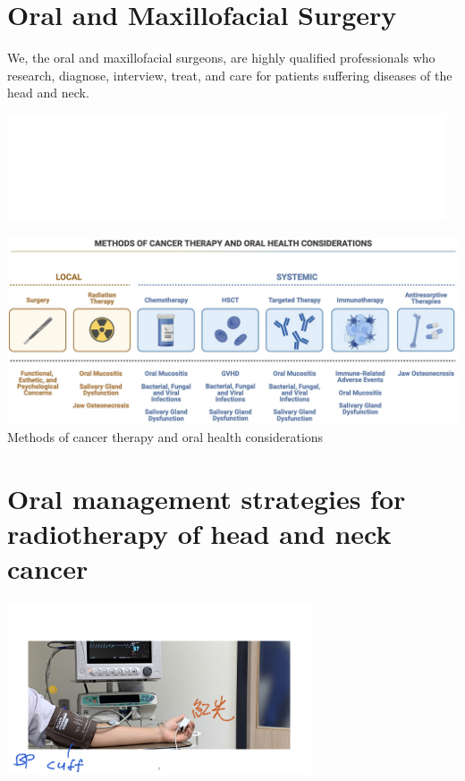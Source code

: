 \documentclass[
paper=landscape,
paper=160mm:90mm, %
fontsize=11pt, %
pagesize, %
parskip=half-, %
]{scrartcl} %
\theoremstyle{mythmstyle} %
\begin{document}
\section{Oral and Maxillofacial Surgery}

We, the oral and maxillofacial surgeons, are highly qualified professionals who research, diagnose, interview, treat, and care for patients suffering diseases of the head and neck.


\includegraphics[width=13cm]{TAOMS_LOGO.png}

\clearpage
\autocite{Harris2022}
\includegraphics[width=0.8\linewidth]{froh-03-874332-g001.jpg}
Methods of cancer therapy and oral health considerations


\section{Oral management strategies for radiotherapy of head and neck cancer} %
\autocite{Kawashita2020}
\begin{center} %
    \centering
    \captionsetup{labelformat=empty}
    \includegraphics[width=9cm]{ContemporaryOMS_vitals.jpeg.001.jpeg}
\end{center}
\end{document}
